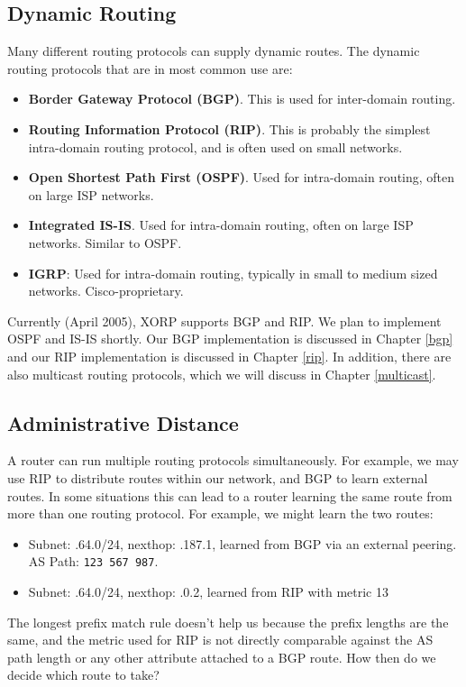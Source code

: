 \subsection{Dynamic Routing}

Many different routing protocols can supply dynamic routes.  The dynamic
routing protocols that are in most common use are:
\begin{itemize}
\item {\bf Border Gateway Protocol (BGP)}.  This is used for
inter-domain routing.
\item {\bf Routing Information Protocol (RIP)}.  This is probably the
simplest intra-domain routing protocol, and is often used on small
networks.
\item {\bf Open Shortest Path First (OSPF)}.  Used for intra-domain routing,
often on large ISP networks.
\item {\bf Integrated IS-IS}.  Used for intra-domain routing, often
on large ISP networks.  Similar to OSPF.
\item {\bf IGRP}: Used for intra-domain routing, typically in small to
medium sized networks.  Cisco-proprietary.
\end{itemize}
Currently (April 2005), XORP supports BGP and RIP.  We plan to
implement OSPF and IS-IS shortly.  Our BGP implementation is discussed
in Chapter \ref{bgp} and our RIP implementation is discussed in
Chapter \ref{rip}.  In addition, there are also multicast routing
protocols, which we will discuss in Chapter \ref{multicast}.

\subsection{Administrative Distance}

A router can run multiple routing protocols simultaneously.  For
example, we may use RIP to distribute routes within our network, and
BGP to learn external routes.  In some situations this can lead to a
router learning the same route from more than one routing protocol.
For example, we might learn the two routes:
\begin{itemize}
\item Subnet: {.64.0/24}, nexthop: {.187.1},
learned from BGP via an external peering. AS Path: {\tt 123 567 987}.
\item Subnet: {.64.0/24}, nexthop: {.0.2}, learned
from RIP with metric 13
\end{itemize}
The longest prefix match rule doesn't help us because the prefix
lengths are the same, and the metric used for RIP is not directly
comparable against the AS path length or any other attribute attached
to a BGP route.  How then do we decide which route to take?

